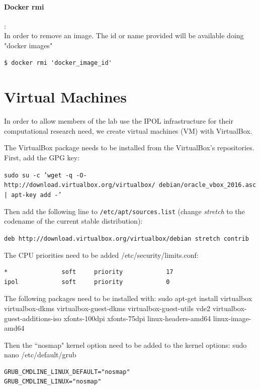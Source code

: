 \documentclass[a4paper,12pt]{article}
\begin{document}
\paragraph{Docker rmi}:\\
In order to remove an image. The id or name provided will be available doing "docker images"
\begin{lstlisting}[firstnumber=1,breaklines]
  $ docker rmi 'docker_image_id'
\end{lstlisting}



\section{Virtual Machines}
\label{sec:virtual_machines}
In order to allow members of the lab use the IPOL infrastructure for their computational research need, we create virtual machines (VM) with VirtualBox.

The VirtualBox package needs to be installed from the VirtualBox's repositories. First, add the GPG key:

{\tt sudo su -c 'wget -q -O- http://download.virtualbox.org/virtualbox/\
debian/oracle\_vbox\_2016.asc | apt-key add -'}

Then add the following line to {\tt /etc/apt/sources.list} (change \emph{stretch} to the codename of the current stable distribution):

{\tt deb http://download.virtualbox.org/virtualbox/debian stretch contrib}

The CPU priorities need to be added /etc/security/limits.conf:
\begin{verbatim}
*               soft     priority            17
ipol            soft     priority            0
\end{verbatim}


The following packages need to be installed with: sudo apt-get install virtualbox virtualbox-dkms virtualbox-guest-dkms virtualbox-guest-utils vde2 virtualbox-guest-additions-iso xfonts-100dpi xfonts-75dpi linux-headers-amd64 linux-image-amd64

Then the ``nosmap" kernel option need to be added to the kernel options: sudo nano /etc/default/grub

\begin{verbatim}
GRUB_CMDLINE_LINUX_DEFAULT="nosmap"
GRUB_CMDLINE_LINUX="nosmap"
\end{verbatim}
\end{document}
